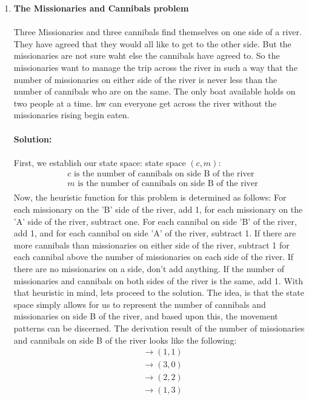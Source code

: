 \documentclass[11pt]{article}
\begin{document}
\begin{enumerate}
\item \textbf{The Missionaries and Cannibals problem}\\\\
Three Missionaries and three cannibals find themselves on one side of a river. They have agreed that they would all like to get to the other side. But the missionaries are not sure waht else the cannibals have agreed to. So the missionaries want to manage the trip across the river in such a way that the number of missionaries on either side of the river is never less than the number of cannibals who are on the same. The only boat available holds on two people at a time. hw can everyone get across the river without the missionaries rising begin eaten. \\\\
\textbf{Solution:}\\\\
First, we establish our state space: 
state space $(c, m)$:
\begin{align*}
&c\text{ is the number of cannibals on side B of the river}\\
&m \text{ is the number of cannibals on side B of the river}\\
\end{align*}
Now, the heuristic function for this problem is determined as follows: For each missionary on the 'B' side of the river, add 1, for each missionary on the 'A' side of the river, subtract one. For each cannibal on side 'B' of the river, add 1, and for each cannibal on side 'A' of the river, subtract 1. If there are more cannibals than missionaries on either side of the river, subtract 1 for each cannibal above the number of missionaries on each side of the river. If there are no missionaries on a side, don't add anything. If the number of missionaries and cannibals on both sides of the river is the same, add 1. 
With that heuristic in mind, lets proceed to the solution. The idea, is that the state space simply allows for us to represent the number of cannibals and missionaries on side B of the river, and based upon this, the movement patterns can be discerned. 
The derivation result of the number of missionaries and cannibals on side B of the river looks like the following: 
\begin{align*}
&\rightarrow (1,1)\\
&\rightarrow (3,0)\\
&\rightarrow (2,2)\\
&\rightarrow (1,3)\\

\end{align*}
\end{enumerate}
\end{document}

